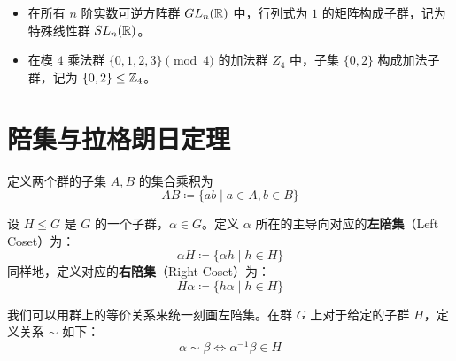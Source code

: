 \documentclass[11pt]{article}
\begin{document}
\begin{cnexample}[子群实例]
    \begin{itemize}
        \item 在所有 $n$ 阶实数可逆方阵群 $GL_n(\mathbb{R})$ 中，行列式为 $1$ 的矩阵构成子群，记为特殊线性群 $SL_n(\mathbb{R})$。
        \item 在模 $4$ 乘法群 $\{0,1,2,3\} \pmod 4$ 的加法群 $Z_4$ 中，子集 $\{0, 2\}$ 构成加法子群，记为 $\{0, 2\} \le \mathbb{Z}_4$。
    \end{itemize}
\end{cnexample}

\section{陪集与拉格朗日定理}

\begin{cndefinition}[集合乘法]
    定义两个群的子集 $A, B$ 的集合乘积为
    $$ AB \coloneqq \{ab \mid a \in A, b \in B\} $$
\end{cndefinition}

\begin{cndefinition}[陪集]
    设 $H \le G$ 是 $G$ 的一个子群，$\alpha \in G$。定义 $\alpha$ 所在的主导向对应的\textbf{左陪集}（Left Coset）为：
    $$ \alpha H \coloneqq \{\alpha h \mid h \in H\} $$
    同样地，定义对应的\textbf{右陪集}（Right Coset）为：
    $$ H\alpha \coloneqq \{h\alpha \mid h \in H\} $$
\end{cndefinition}

我们可以用群上的等价关系来统一刻画左陪集。在群 $G$ 上对于给定的子群 $H$，定义关系 $\sim$ 如下：
$$ \alpha \sim \beta \iff \alpha^{-1}\beta \in H $$
\end{document}
